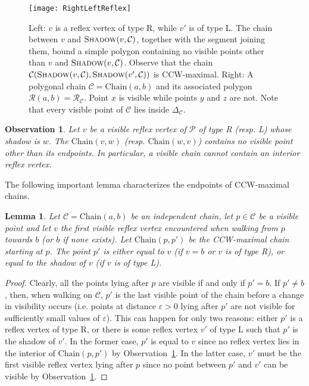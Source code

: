 \documentclass[a4paper]{article}
\newtheorem{lemma}{Lemma}
\newtheorem{observation}{Observation}
\newcommand{\Poly}{\ensuremath{\mathcal{P}}}               \newcommand{\bd}{\ensuremath{\partial \Poly} }                 \newcommand{\Vis}{\ensuremath{\mathrm{Vis}_\Poly}} \newcommand{\VisC}{\ensuremath{\mathrm{Vis}_{\mathcal{C}}}} \newcommand{\VisCprime}{\ensuremath{\mathrm{Vis}_{\mathcal{C'}}}} \newcommand{\E}{\ensuremath{\mathrm{E}}}                    \newcommand{\Rin}{\ensuremath{r}}      \newcommand{\Rout}{\ensuremath{\bar{r}}}      \newcommand{\Hout}{\ensuremath{\bar{h}}}      \newcommand{\chain}{\ensuremath{{\mathrm{Chain}}}}     \newcommand{\region}{\ensuremath{{{\mathcal R}}}}
\newcommand{\regionC}{\ensuremath{{{\mathcal R_{\mathcal C}}}}}
\newcommand{\coneC}{\ensuremath{{{\Delta_{\mathcal C}}}}}
\newcommand{\C}{\ensuremath{{\mathcal C}}}
\begin{document}
\begin{figure}[tb]
\centering
\texttt{[image: RightLeftReflex]}
\caption{\small Left: $v$ is a reflex vertex of type R, while $v'$ is of type L. The chain between $v$ and $\textsc{Shadow}(v,\mathcal C)$, together with the segment joining them, bound a simple polygon containing no visible points other than $v$ and $\textsc{Shadow}(v,\mathcal C)$.  Observe that the chain $\mathcal{C}(\textsc{Shadow}(v,\mathcal C),\textsc{Shadow}(v',\mathcal C))$ is CCW-maximal. 
Right: A polygonal chain $\mathcal C = \chain(a,b)$ and its associated polygon $\region(a,b) = \regionC$. Point $x$ is visible while points $y$ and $z$ are not. 
Note that every visible point of $\C$ lies inside $\coneC$.}
\label{fig:RightLeftReflex and ConeDefs}
\end{figure}

\begin{observation}\label{obs:VisibleChains}
Let $v$ be a visible reflex vertex of $\Poly$ of type R (resp. L) whose shadow is $w$. The $\chain(v, w)$ (resp. $\chain(w, v)$) contains no visible point other than its endpoints. In particular, a visible chain cannot contain an interior reflex vertex.
\end{observation}








The following important lemma characterizes the endpoints of CCW-maximal chains.



\begin{lemma}\label{lem_key}
Let $\C =\chain(a,b)$ be an independent chain, let $p\in \C$ be a visible point and let $v$ the first visible reflex vertex encountered when walking from $p$ towards $b$ (or $b$ if none exists). Let $\chain(p,p')$ be the CCW-maximal chain starting at $p$. The point $p'$ is either equal to $v$ (if $v=b$ or $v$ is of type R), or equal to the shadow of $v$ (if $v$ is of type L).
\end{lemma}
\begin{proof}
Clearly, all the points lying after $p$ are visible if and only if $p'=b$.
If $p' \neq b$, then, when walking on $\C$, $p'$ is the last visible point of the chain before a change in visibility occurs (i.e. points at distance $\varepsilon >0$ lying after $p'$ are not visible for sufficiently small values of $\varepsilon$).
This can happen for only two reasons: either $p'$ is a reflex vertex of type R, or there is some reflex vertex $v'$ of type L such that $p'$ is the shadow of $v'$.
In the former case, $p'$ is equal to $v$ since no reflex vertex lies in the interior of $\chain(p,p')$ by Observation~\ref{obs:VisibleChains}.
In the latter case, $v'$ must be the first visible reflex vertex lying after $p$ since no point between $p'$ and $v'$ can be visible by Observation~\ref{obs:VisibleChains}.
\end{proof}
\end{document}
